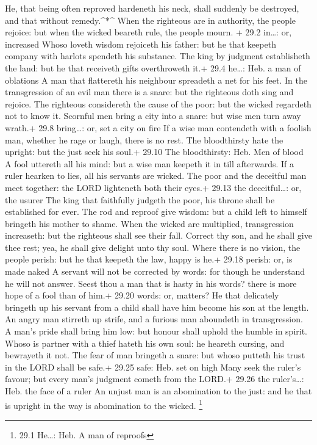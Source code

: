  He, that being often reproved hardeneth his neck, shall
suddenly be destroyed, and that without remedy.\^{}*\^{} 
When the righteous are in authority, the people rejoice: but when the
wicked beareth rule, the people mourn. + 29.2 in\ldots: or, increased
 Whoso loveth wisdom rejoiceth his father: but he that
keepeth company with harlots spendeth his substance.  The
king by judgment establisheth the land: but he that receiveth gifts
overthroweth it.+ 29.4 he\ldots: Heb. a man of oblations  A
man that flattereth his neighbour spreadeth a net for his feet.
 In the transgression of an evil man there is a snare: but
the righteous doth sing and rejoice.  The righteous
considereth the cause of the poor: but the wicked regardeth not to know
it.  Scornful men bring a city into a snare: but wise men
turn away wrath.+ 29.8 bring\ldots: or, set a city on fire 
If a wise man contendeth with a foolish man, whether he rage or laugh,
there is no rest.  The bloodthirsty hate the upright: but
the just seek his soul.+ 29.10 The bloodthirsty: Heb. Men of blood
 A fool uttereth all his mind: but a wise man keepeth it in
till afterwards.  If a ruler hearken to lies, all his
servants are wicked.  The poor and the deceitful man meet
together: the LORD lighteneth both their eyes.+ 29.13 the
deceitful\ldots: or, the usurer  The king that faithfully
judgeth the poor, his throne shall be established for ever.
 The rod and reproof give wisdom: but a child left to
himself bringeth his mother to shame.  When the wicked are
multiplied, transgression increaseth: but the righteous shall see their
fall.  Correct thy son, and he shall give thee rest; yea,
he shall give delight unto thy soul.  Where there is no
vision, the people perish: but he that keepeth the law, happy is he.+
29.18 perish: or, is made naked  A servant will not be
corrected by words: for though he understand he will not answer.
 Seest thou a man that is hasty in his words? there is more
hope of a fool than of him.+ 29.20 words: or, matters?  He
that delicately bringeth up his servant from a child shall have him
become his son at the length.  An angry man stirreth up
strife, and a furious man aboundeth in transgression.  A
man's pride shall bring him low: but honour shall uphold the humble in
spirit.  Whoso is partner with a thief hateth his own soul:
he heareth cursing, and bewrayeth it not.  The fear of man
bringeth a snare: but whoso putteth his trust in the LORD shall be
safe.+ 29.25 safe: Heb. set on high  Many seek the ruler's
favour; but every man's judgment cometh from the LORD.+ 29.26 the
ruler's\ldots: Heb. the face of a ruler  An unjust man is
an abomination to the just: and he that is upright in the way is
abomination to the wicked. \footnote{29.1 He\ldots: Heb. A man of
  reproofs}

